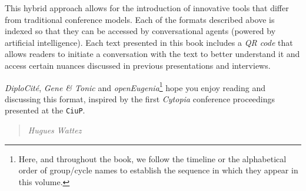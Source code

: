 This hybrid approach allows for the introduction of innovative tools
that differ from traditional conference models. Each of the formats
described above is indexed so that they can be accessed by
conversational agents (powered by artificial intelligence). Each text
presented in this book includes a \emph{QR code} that allows readers to
initiate a conversation with the text to better understand it and access
certain nuances discussed in previous presentations and interviews.

\emph{DiploCité}, \emph{Gene \& Tonic} and \emph{openEugenia}\footnote{Here,
  and throughout the book, we follow the timeline or the alphabetical
  order of group/cycle names to establish the sequence in which they
  appear in this volume.} hope you enjoy reading and discussing this
format, inspired by the first \emph{Cytopia} conference proceedings
presented at the \texttt{CiuP}.

\begin{quote}
\emph{Hugues Wattez}
\end{quote}

\newpage

\null

\cleardoublepage
